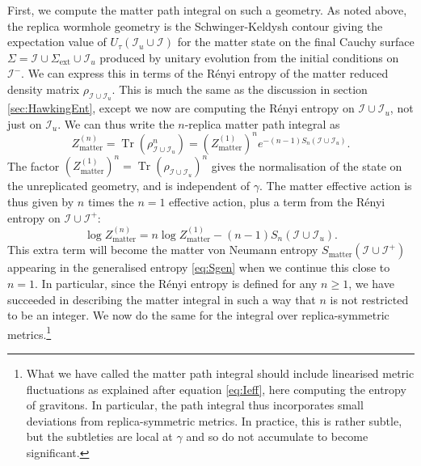 \documentclass[letterpaper,12pt]{article}
\DeclareMathOperator{\Tr}{Tr}
\newcommand*{\scri}{\mathscr{I}} %
\newcommand*{\island}{\mathcal{I}}
\begin{document}
First, we compute the matter path integral on such a geometry. As noted above, the replica wormhole geometry is the Schwinger-Keldysh contour giving the expectation value of $U_\tau(\scri_u\cup \island)$ for the matter state on the final Cauchy surface $\Sigma = \island \cup \Sigma_\mathrm{ext}\cup\scri_u$ produced by unitary evolution from the initial conditions on $\scri^-$. We can express this in terms of the R\'enyi entropy of the matter reduced density matrix $\rho_{\island\cup\scri_u}$. This is much the same as the discussion in section \ref{sec:HawkingEnt}, except we now are computing the R\'enyi entropy on $\island\cup\scri_u$, not just on $\scri_u$. We can thus write the $n$-replica matter path integral as
\begin{equation}\label{eq:Znmatter}
	Z^{(n)}_\text{matter} = \Tr(\rho_{\island\cup\scri_u}^n) = \left(Z^{(1)}_\text{matter}\right)^n e^{-(n-1)S_n(\island\cup\scri_u)}.
\end{equation}
The factor $\left(Z^{(1)}_\text{matter}\right)^n =\Tr(\rho_{\island\cup\scri_u})^n$ gives the normalisation of the state on the unreplicated geometry, and is independent of $\gamma$. The matter effective action is thus given by $n$ times the $n=1$ effective action, plus a term from the R\'enyi entropy on $\island\cup\scri^+$:
\begin{equation}
	\log Z^{(n)}_\text{matter} = n \log Z^{(1)}_\text{matter}  - (n-1)S_n(\island\cup\scri_u) .
\end{equation}
This extra term will become the matter von Neumann entropy $S_\mathrm{matter}(\island\cup\scri^+)$ appearing in the generalised entropy \eqref{eq:Sgen} when we continue this close to $n=1$. In particular, since the R\'enyi entropy is defined for any $n\geq 1$, we have succeeded in describing the matter integral in such a way that $n$ is not restricted to be an integer. We now do the same for the integral over replica-symmetric metrics.\footnote{What we have called the matter path integral should include linearised metric fluctuations as explained after equation \ref{eq:Ieff}, here computing the entropy of gravitons. In particular, the path integral thus incorporates small deviations from replica-symmetric metrics. In practice, this is rather subtle, but the subtleties are local at $\gamma$ and so do not accumulate to become significant.}
\end{document}
